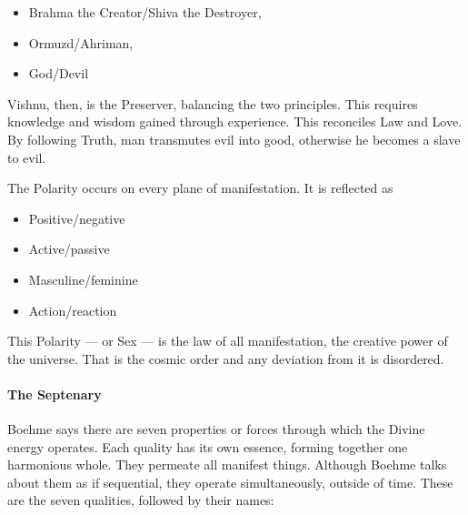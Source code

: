 \begin{itemize}
\item Brahma the Creator/Shiva the Destroyer, 
\item Ormuzd/Ahriman, 
\item God/Devil 
\end{itemize}
Vishnu, then, is the Preserver, balancing the two principles. This requires knowledge and wisdom gained through experience. This reconciles Law and Love. By following Truth, man transmutes evil into good, otherwise he becomes a slave to evil.

The Polarity occurs on every plane of manifestation. It is reflected as

\begin{itemize}
\item Positive/negative 
\item Active/passive 
\item Masculine/feminine 
\item Action/reaction 
\end{itemize}
This Polarity — or Sex — is the law of all manifestation, the creative power of the universe. That is the cosmic order and any deviation from it is disordered.

\paragraph{The Septenary}
Boehme says there are seven properties or forces through which the Divine energy operates. Each quality has its own essence, forming together one harmonious whole. They permeate all manifest things. Although Boehme talks about them as if sequential, they operate simultaneously, outside of time. These are the seven qualities, followed by their names:

